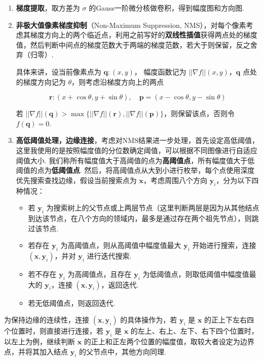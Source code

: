 \documentclass[
]{article}
\begin{document}
\begin{enumerate}
\def\labelenumi{\arabic{enumi}.}
\item
  \textbf{梯度提取}，取方差为 \(\sigma\)
  的Gauss一阶微分核做卷积，得到幅度图和方向图.
\item
  \textbf{非极大值像素梯度抑制}（Non-Maximum Suppression,
  NMS），对每个像素考虑其梯度方向上的两个临近点，利用之前写好的\textbf{双线性插值}获得两点处的梯度值，然后判断中间点的梯度范数大于两端的梯度范数，若大于则保留，反之舍弃（归零）.

  具体来讲，设当前像素点为 \(\boldsymbol{q}: (x, y)\)， 幅度函数记为
  \(||\nabla f||(x, y)\)，\(\boldsymbol{q}\) 点处的梯度方向记为
  \(\theta\)，则考虑沿梯度方向上的两点

  \[\boldsymbol{r}:(x+\cos \theta, y+\sin\theta),\quad
  \boldsymbol{p}=(x-\cos\theta, y-\sin\theta)\]

  若
  \(||\nabla f||(\boldsymbol{q}) > \max\{||\nabla f||(\boldsymbol{r}),||\nabla f||(\boldsymbol{p})\}\)，则保留该点，否则令
  \(f(\boldsymbol{q}) = 0\).
\item
  \textbf{高低阈值处理，边缘连接}，考虑对NMS结果进一步处理，首先设定高低阈值，这里我使用的是按照幅度值的分位数确定阈值，可以根据不同图像进行自适应阈值大小.
  我们称所有幅度值大于高阈值的点为\textbf{高阈值点}，所有幅度值大于低阈值的点为\textbf{低阈值点}.
  然后，将高阈值点从大到小进行枚举，每个点使用深度优先搜索查找边缘，假设当前搜索点为
  \(\boldsymbol{x}\)，考虑周围八个方向
  \(\boldsymbol{y}_i\)，分为以下四种情况：

  \begin{itemize}
  \item
    若 \(\boldsymbol{y}_i\)
    为搜索树上的父节点或上两层节点（这里判断两层是因为从其他结点到达该节点，在八个方向的领域内，最多是通过存在两个祖先节点），则跳过该节点.
  \item
    若存在 \(\boldsymbol{y}_i\) 为高阈值点，则从高阈值中幅度值最大
    \(\boldsymbol{y}_i\) 开始进行搜索，连接
    \((\boldsymbol{x}, \boldsymbol{y}_i)\)，并对 \(\boldsymbol{y}_i\)
    进行迭代搜索.
  \item
    若不存在 \(\boldsymbol{y}_i\) 为高阈值点，且存在
    \(\boldsymbol{y}_i\) 为低阈值点，则取低阈值中幅度值最大的
    \(\boldsymbol{y}_i\)，连接
    \((\boldsymbol{x}, \boldsymbol{y}_i)\)，返回迭代.
  \item
    若无低阈值点，则返回迭代.
  \end{itemize}
\end{enumerate}

为保持边缘的连续性，连接 \((\boldsymbol{x}, \boldsymbol{y}_i)\)
的具体操作为，若 \(\boldsymbol{y}_i\) 是 \(\boldsymbol{x}\)
的正上下左右四个位置时，则直接进行连接，若 \(\boldsymbol{y}_i\) 是
\(\boldsymbol{x}\)
的左上、右上、左下、右下四个位置时，以左上为例，继续判断
\(\boldsymbol{x}\)
的正上和正左两个位置的幅度值，取较大者设定为边界点，并将其加入结点
\(\boldsymbol{y}_i\) 的父节点中，其他方向同理.
\end{document}
